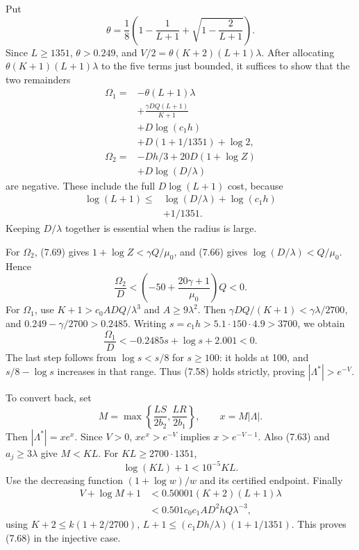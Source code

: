 \documentclass[
  11pt,
  a4paper,
]{article}
\begin{document}
Put \[
\theta=\frac18\left(1-\frac1{L+1}
+\sqrt{1-\frac2{L+1}}\right).
\] Since \(L\ge1351\), \(\theta>0.249\), and
\(V/2=\theta(K+2)(L+1)\lambda\). After allocating
\(\theta(K+1)(L+1)\lambda\) to the five terms just bounded, it suffices
to show that the two remainders \[
\begin{aligned}
\Omega_1={}&-\theta(L+1)\lambda\\
&+\frac{\gamma DQ(L+1)}{K+1}\\
&+D\log(c_1h)\\
&+D(1+1/1351)+\log2,\\
\Omega_2={}&-Dh/3+20D(1+\log Z)\\
&+D\log(D/\lambda)
\end{aligned}
\] are negative. These include the full \(D\log(L+1)\) cost, because \[
\begin{aligned}
\log(L+1)\le{}&\log(D/\lambda)+\log(c_1h)\\
&+1/1351.
\end{aligned}
\] Keeping \(D/\lambda\) together is essential when the radius is large.

For \(\Omega_2\), (7.69) gives \(1+\log Z<\gamma Q/\mu_0\), and (7.66)
gives \(\log(D/\lambda)<Q/\mu_0\). Hence \[
\frac{\Omega_2}{D}
<\left(-50+\frac{20\gamma+1}{\mu_0}\right)Q<0.
\] For \(\Omega_1\), use \(K+1>c_0ADQ/\lambda^3\) and
\(A\ge9\lambda^2\). Then \(\gamma DQ/(K+1)<\gamma\lambda/2700\), and
\(0.249-\gamma/2700>0.2485\). Writing
\(s=c_1h>5.1\cdot150\cdot4.9>3700\), we obtain \[
\frac{\Omega_1}{D}<-0.2485s+\log s+2.001<0.
\] The last step follows from \(\log s<s/8\) for \(s\ge100\): it holds
at 100, and \(s/8-\log s\) increases in that range. Thus (7.58) holds
strictly, proving \(|\Lambda^*|>e^{-V}\).

To convert back, set \[
M=\max\left\{\frac{LS}{2b_2},\frac{LR}{2b_1}\right\},
\qquad x=M|\Lambda|.
\] Then \(|\Lambda^*|=xe^x\). Since \(V>0\), \(xe^x>e^{-V}\) implies
\(x>e^{-V-1}\). Also (7.63) and \(a_j\ge3\lambda\) give \(M<KL\). For
\(KL\ge2700\cdot1351\), \[
\log(KL)+1<10^{-5}KL.
\] Use the decreasing function \((1+\log w)/w\) and its certified
endpoint. Finally \[
\begin{aligned}
V+\log M+1
&<0.50001(K+2)(L+1)\lambda\\
&<0.501c_0c_1AD^2hQ\lambda^{-3},
\end{aligned} \tag{7.71}
\] using \(K+2\le k(1+2/2700)\), \(L+1\le(c_1Dh/\lambda)(1+1/1351)\).
This proves (7.68) in the injective case.
\end{document}

